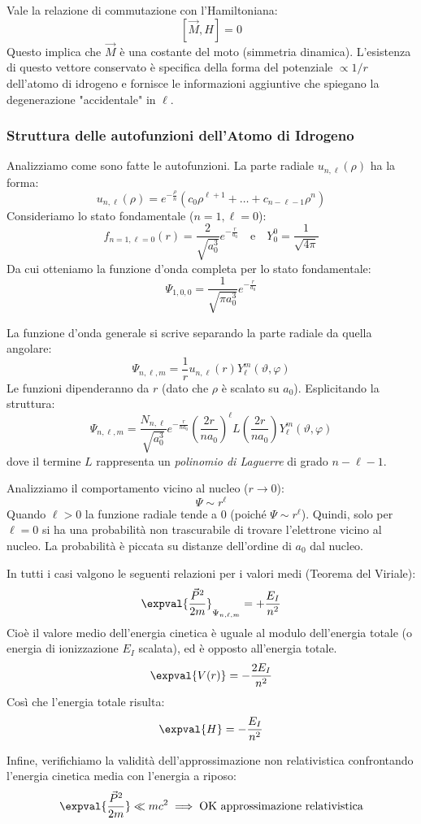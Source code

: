 Vale la relazione di commutazione con l'Hamiltoniana:
\[
[\vec{M}, H] = 0
\]
Questo implica che \( \vec{M} \) è una costante del moto (simmetria dinamica). L'esistenza di questo vettore conservato è specifica della forma del potenziale \( \propto 1/r \) dell'atomo di idrogeno e fornisce le informazioni aggiuntive che spiegano la degenerazione "accidentale" in \( \ell \).

\subsubsection{Struttura delle autofunzioni dell'Atomo di Idrogeno}

Analizziamo come sono fatte le autofunzioni. La parte radiale $u_{n,\ell}(\rho)$ ha la forma:
\begin{equation}
    u_{n,\ell}(\rho)= e^{-\frac{\rho}{n}} \left( c_0 \rho^{\ell+1} + \dots + c_{n-\ell-1}\rho^n \right)
\end{equation}
Consideriamo lo stato fondamentale ($n=1, \ell=0$):
\[
    f_{n=1, \ell=0}(r) = \frac{2}{\sqrt{a_0^3}} e^{-\frac{r}{a_0}} \quad \text{e} \quad Y_0^0 = \frac{1}{\sqrt{4\pi}}
\]
Da cui otteniamo la funzione d'onda completa per lo stato fondamentale:
\begin{equation}
    \Psi_{1,0,0} = \frac{1}{\sqrt{\pi a_0^3}} e^{-\frac{r}{a_0}}
\end{equation}

La funzione d'onda generale si scrive separando la parte radiale da quella angolare:
\begin{equation}
    \Psi_{n,\ell,m} = \frac{1}{r} u_{n,\ell}(r) Y_{\ell}^m(\vartheta, \varphi)
\end{equation}
Le funzioni dipenderanno da $r$ (dato che $\rho$ è scalato su $a_0$). Esplicitando la struttura:
\begin{equation}
    \Psi_{n,\ell,m} = \frac{N_{n,\ell}}{\sqrt{a_0^3}} e^{-\frac{r}{n a_0}} \left( \frac{2r}{n a_0} \right)^\ell L\left( \frac{2r}{n a_0} \right) Y_\ell^m(\vartheta, \varphi)
\end{equation}
dove il termine $L$ rappresenta un \textit{polinomio di Laguerre} di grado $n-\ell-1$.

Analizziamo il comportamento vicino al nucleo ($r \to 0$):
\[
    \Psi \sim r^\ell
\]
Quando $\ell > 0$ la funzione radiale tende a 0 (poiché $\Psi \sim r^\ell$). Quindi, solo per $\ell=0$ si ha una probabilità non trascurabile di trovare l'elettrone vicino al nucleo. La probabilità è piccata su distanze dell'ordine di $a_0$ dal nucleo.

In tutti i casi valgono le seguenti relazioni per i valori medi (Teorema del Viriale):
\[
    \expval{\frac{\vec{P}^2}{2m}}_{\Psi_{n,\ell,m}} = + \frac{E_I}{n^2}
\]
Cioè il valore medio dell'energia cinetica è uguale al modulo dell'energia totale (o energia di ionizzazione $E_I$ scalata), ed è opposto all'energia totale.
\[
    \expval{V(r)} = - \frac{2 E_I}{n^2}
\]
Così che l'energia totale risulta:
\[
    \expval{H} = - \frac{E_I}{n^2}
\]

Infine, verifichiamo la validità dell'approssimazione non relativistica confrontando l'energia cinetica media con l'energia a riposo:
\[
    \expval{\frac{\vec{P}^2}{2m}} \ll mc^2 \implies \text{OK approssimazione relativistica}
\]
